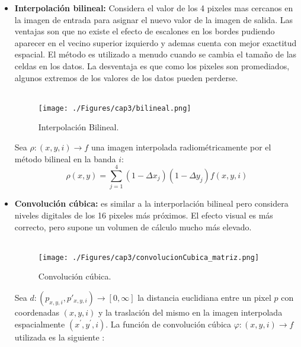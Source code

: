 \begin{itemize}
		\item \textbf{Interpolaci\'on bilineal:} Considera el valor de los 4 pixeles mas cercanos en la imagen de entrada para asignar el nuevo valor de la imagen de salida. Las ventajas son que no existe el efecto de escalones en los bordes pudiendo aparecer en el vecino superior izquierdo y ademas cuenta con mejor exactitud espacial. El m\'etodo es utilizado a menudo cuando se cambia el tama\~{n}o de las celdas en los datos. La desventaja es que como los pixeles son promediados, algunos extremos de los valores de los datos pueden perderse.\\~\\
		
		\begin{figure}[H]
			\centering
			\texttt{[image: ./Figures/cap3/bilineal.png]}
			\caption{Interpolaci\'on Bilineal.}
			\label{fig:bilineal2}
		\end{figure}
		Sea $ \rho:(x,y,i) \longrightarrow f$ una imagen interpolada radiom\'etricamente por el m\'etodo bilineal en la banda $ i $:
		\begin{equation}
		\rho(x,y) = \sum_{j=1}^{4}(1-\Delta x_{j})(1-\Delta y_{j})f(x,y,i)
		\end{equation}	
		    		\item \textbf{Convoluci\'on c\'ubica:} es similar a la interporlaci\'on bilineal pero considera niveles digitales de los 16 pixeles m\'as pr\'oximos. El efecto visual es m\'as correcto, pero supone un volumen de c\'alculo mucho m\'as elevado. \\~\\
		    				    \begin{figure}[H]
		    				    	\centering
		    				    	\texttt{[image: ./Figures/cap3/convolucionCubica\_matriz.png]}
		    				    	\caption{Convoluci\'on c\'ubica.}
		    				    	\label{fig:convCubica2}
		    				    \end{figure}
					Sea $ d:(p_{x,y,i},p'_{x,y,i})\longrightarrow [0,\infty] $ la distancia euclidiana entre un pixel $ p $ con coordenadas $ (x,y,i) $ y la traslaci\'on del mismo en la imagen interpolada espacialmente $ (x^{'},y^{'},i)$. La funci\'on de convoluci\'on c\'ubica $ \varphi:(x,y,i) \longrightarrow f$ utilizada es la siguiente \cite{guide1999erdas}:
										\begin{align}

\end{align}
\end{itemize}
